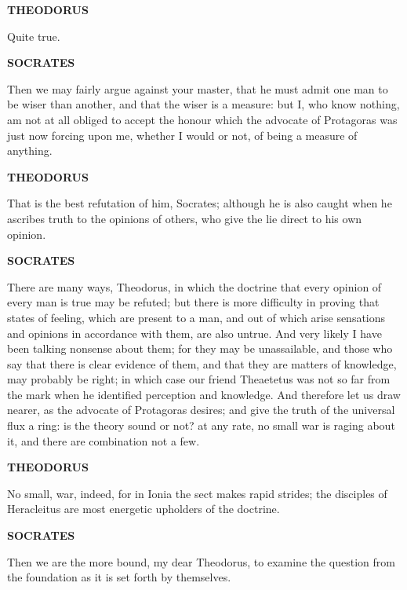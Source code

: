 \documentclass[11pt,letter]{article}
\begin{document}
\par \textbf{THEODORUS}
\par   Quite true.

\par \textbf{SOCRATES}
\par   Then we may fairly argue against your master, that he must admit one man to be wiser than another, and that the wiser is a measure:  but I, who know nothing, am not at all obliged to accept the honour which the advocate of Protagoras was just now forcing upon me, whether I would or not, of being a measure of anything.

\par \textbf{THEODORUS}
\par   That is the best refutation of him, Socrates; although he is also caught when he ascribes truth to the opinions of others, who give the lie direct to his own opinion.

\par \textbf{SOCRATES}
\par   There are many ways, Theodorus, in which the doctrine that every opinion of every man is true may be refuted; but there is more difficulty in proving that states of feeling, which are present to a man, and out of which arise sensations and opinions in accordance with them, are also untrue. And very likely I have been talking nonsense about them; for they may be unassailable, and those who say that there is clear evidence of them, and that they are matters of knowledge, may probably be right; in which case our friend Theaetetus was not so far from the mark when he identified perception and knowledge. And therefore let us draw nearer, as the advocate of Protagoras desires; and give the truth of the universal flux a ring:  is the theory sound or not? at any rate, no small war is raging about it, and there are combination not a few.

\par \textbf{THEODORUS}
\par   No small, war, indeed, for in Ionia the sect makes rapid strides; the disciples of Heracleitus are most energetic upholders of the doctrine.

\par \textbf{SOCRATES}
\par   Then we are the more bound, my dear Theodorus, to examine the question from the foundation as it is set forth by themselves.
\end{document}
